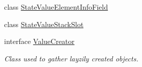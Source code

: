 \begin{DoxyCompactItemize}
\item 
class \hyperlink{classgov_1_1nasa_1_1jpf_1_1inspector_1_1server_1_1programstate_1_1_state_value_element_info_field}{State\+Value\+Element\+Info\+Field}
\item 
class \hyperlink{classgov_1_1nasa_1_1jpf_1_1inspector_1_1server_1_1programstate_1_1_state_value_stack_slot}{State\+Value\+Stack\+Slot}
\item 
interface \hyperlink{interfacegov_1_1nasa_1_1jpf_1_1inspector_1_1server_1_1programstate_1_1_value_creator}{Value\+Creator}
\begin{DoxyCompactList}\small\item\em Class used to gather layzily created objects. \end{DoxyCompactList}\end{DoxyCompactItemize}
